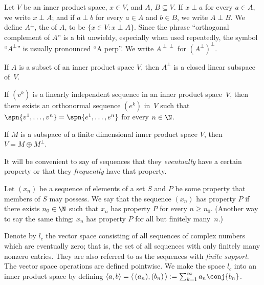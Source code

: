 \begin{notn}\label{0001511} Let $V$ be an inner product space, $x \in V$, and $A$,
$B \subseteq V$. If $x \perp a$ for every $a \in A$, we write $x \perp A$; and if $a
\perp b$ for every $a \in A$ and $b \in B$, we write $A \perp B$.
We define $A^\perp$, the
 of $A$, to be $\{x \in V\colon x \perp A\}$.  Since the phrase ``orthogonal complement of $A$''
is a bit unwieldy, especially when used repeatedly, the symbol ``$A^\perp$'' is usually pronounced ``A perp''.
We write $A^{\perp\perp}$ for $\left(A^\perp\right)^\perp$.
\end{notn}

\begin{prop}\label{0001512} If $A$ is a subset of an inner product space $V$, then
$A^\perp$ is a closed linear subspace of~$V$.
\end{prop}

\begin{prop} If $(v^k)$ is a linearly independent sequence in
an inner product space~$V$, then there exists an orthonormal sequence $(e^k)$ in~$V$ such
that $\spn\{v^1, \dots, v^n\} = \spn\{e^1, \dots, e^n\}$ for every $n \in \N$.
\end{prop}

\begin{cor}\label{0001514} If $M$ is a subspace of a finite dimensional inner product
space $V$, then $V = M \oplus M^\perp$.
\end{cor}

It will be convenient to say of sequences that they \emph{eventually} have a certain property or
that they \emph{frequently} have that property.

\begin{defn}\label{C013121}  Let $(x_n)$ be a sequence of elements of a set $S$ and $P$ be some
property that members of $S$ may possess.  We say that the sequence $(x_n)$
 has property $P$ if there exists $n_0 \in \N$ such that $x_n$ has
property $P$ for every $n \ge n_0$.  (Another way to say the same thing: $x_n$ has
property $P$ for all but finitely many~$n$.)
\end{defn}

\begin{exam}\label{exam13122} Denote by
$l_c$ the vector space consisting of all sequences of complex numbers which are eventually zero;
that is, the set of all sequences with only finitely many nonzero entries.  They are also referred to as the sequences with
\emph{finite support}.  The vector space operations are defined pointwise.  We make the space $l_c$ into an
inner product space by
defining $\langle a,b \rangle = \langle\, (a_n),(b_n)\, \rangle := \sum_{k=1}^\infty a_n \conj{b_n}$.
\end{exam}

